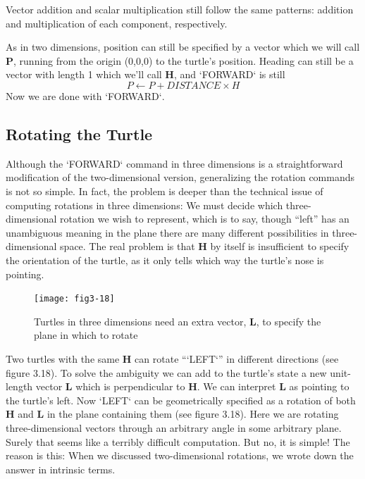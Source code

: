 \documentclass{book}
\begin{document}
Vector addition and scalar multiplication still follow the same patterns:
addition and multiplication of each component, respectively.

As in two dimensions, position can still be specified by a vector which
we will call \textbf{P}, running from the origin (0,0,0) to the turtle's position.
Heading can still be a vector with length 1 which we'll call \textbf{H}, and
\textsc{`FORWARD`} is still
$$P \leftarrow P + DISTANCE \times H$$ Now we are done with \textsc{`FORWARD`}.

\subsection{Rotating the Turtle}

Although the \textsc{`FORWARD`} command in three dimensions is a straightforward
modification of the two-dimensional version, generalizing the rotation
commands is not so simple. In fact, the problem is deeper than the
technical issue of computing rotations in three dimensions: We must
decide which three-dimensional rotation we wish to represent, which is
to say, though ``left'' has an unambiguous meaning in the plane there
are many different possibilities in three-dimensional space.
The real problem is that \textbf{H} by itself is insufficient to specify the
orientation of the turtle, as it only tells which way the turtle's nose is
pointing.

\begin{figure}
\begin{center}
\texttt{[image: fig3-18]}
\caption{Turtles in three dimensions need an extra vector, \textbf{L}, to specify the plane in which to rotate}
\end{center}
\end{figure}


Two turtles with the same \textbf{H} can rotate ``\textsc{`LEFT`}'' in different directions (see
figure 3.18). To solve the ambiguity we can add to the turtle's state a new
unit-length vector \textbf{L} which is perpendicular to \textbf{H}. We can interpret \textbf{L} as
pointing to the turtle's left. Now \textsc{`LEFT`} can be geometrically specified as
a rotation of both \textbf{H} and \textbf{L} in the plane containing them (see figure 3.18).
Here we are rotating three-dimensional vectors through an arbitrary
angle in some arbitrary plane. Surely that seems like a terribly difficult
computation. But no, it is simple! The reason is this: When we discussed
two-dimensional rotations, we wrote down the answer in intrinsic terms.
\end{document}
